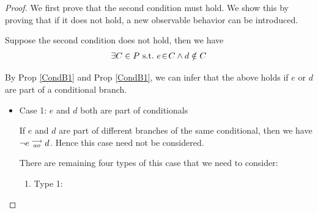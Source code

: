         \begin{proof}
            We first prove that the second condition must hold. We show this by proving that if it does not hold, a new observable behavior     can be introduced. 

            Suppose the second condition does not hold, then we have 
            \begin{align*}
                \exists C \in P \ \text{s.t.} \  e\!\in\!C \wedge d \notin C
            \end{align*}

            By Prop \ref{CondB1} and Prop \ref{CondB1}, we can infer that the above holds if $e$ or $d$ are part of a conditional branch. 
            \begin{itemize}
                \item Case 1: $e$ and $d$ both are part of conditionals 

                    If $e$ and $d$ are part of different branches of the same conditional, then we have $\neg e\stackrel{\longrightarrow}{_{ao}}d$. Hence this  case need not be considered.     

                    There are remaining four types of this case that we need to consider: 

                    \begin{enumerate}
                        \item Type 1: 


\end{enumerate}
\end{itemize}
\end{proof}
